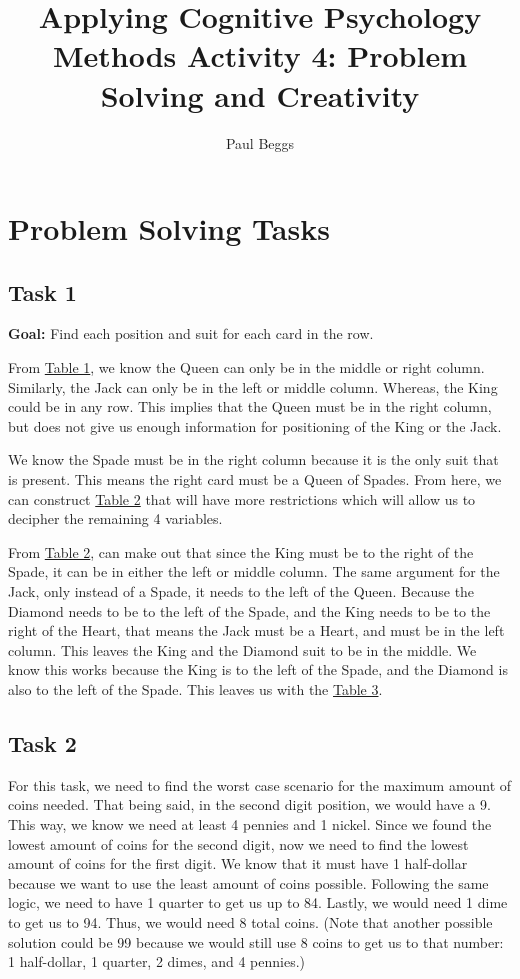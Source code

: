 \documentclass[stu,12pt,floatsintext]{apa7}
\title{Applying Cognitive Psychology Methods Activity 4: Problem Solving and Creativity} %
\author{Paul Beggs}
\begin{document}
\maketitle 

\section{Problem Solving Tasks}

\subsection{Task 1}


\textbf{Goal:} Find each position and suit for each card in the row.

From \hyperref[tab:table1]{Table 1}, we know the Queen can only be in the middle or right column. Similarly, the Jack can only be in the left or middle column. Whereas, the King could be in any row. This implies that the Queen must be in the right column, but does not give us enough information for positioning of the King or the Jack.

We know the Spade must be in the right column because it is the only suit that is present. This means the right card must be a Queen of Spades. From here, we can construct \hyperref[tab:table2]{Table 2} that will have more restrictions which will allow us to decipher the remaining 4 variables. 

From \hyperref[tab:table2]{Table 2}, can make out that since the King must be to the right of the Spade, it can be in either the left or middle column. The same argument for the Jack, only instead of a Spade, it needs to the left of the Queen. Because the Diamond needs to be to the left of the Spade, and the King needs to be to the right of the Heart, that means the Jack must be a Heart, and must be in the left column. This leaves the King and the Diamond suit to be in the middle. We know this works because the King is to the left of the Spade, and the Diamond is also to the left of the Spade. This leaves us with the \hyperref[tab:table3]{Table 3}.

\subsection{Task 2}

For this task, we need to find the worst case scenario for the maximum amount of coins needed. That being said, in the second digit position, we would have a 9. This way, we know we need at least 4 pennies and 1 nickel. Since we found the lowest amount of coins for the second digit, now we need to find the lowest amount of coins for the first digit. We know that it must have 1 half-dollar because we want to use the least amount of coins possible. Following the same logic, we need to have 1 quarter to get us up to 84. Lastly, we would need 1 dime to get us to 94. Thus, we would need 8 total coins. (Note that another possible solution could be 99 because we would still use 8 coins to get us to that number: 1 half-dollar, 1 quarter, 2 dimes, and 4 pennies.)
\end{document}
